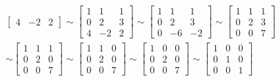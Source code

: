 \begin{gather*}
\begin{bmatrix}
        4 & -2 & 2 
        \end{bmatrix}
        \sim
        \begin{bmatrix}
        1 & 1 & 1 \\
        0 & 2 & 3 \\
        4 & -2 & 2 
        \end{bmatrix}
        \sim
        \begin{bmatrix}
        1 & 1 & 1 \\
        0 & 2 & 3 \\
        0 & -6 & -2 
        \end{bmatrix}
        \sim
        \begin{bmatrix}
        1 & 1 & 1 \\
        0 & 2 & 3 \\
        0 & 0 & 7 
        \end{bmatrix}
        \\
        \sim
        \begin{bmatrix}
        1 & 1 & 1 \\
        0 & 2 & 0 \\
        0 & 0 & 7 
        \end{bmatrix}
        \sim
        \begin{bmatrix}
        1 & 1 & 0 \\
        0 & 2 & 0 \\
        0 & 0 & 7 
        \end{bmatrix}
        \sim
        \begin{bmatrix}
        1 & 0 & 0 \\
        0 & 2 & 0 \\
        0 & 0 & 7 
        \end{bmatrix}
        \sim
        \begin{bmatrix}
        1 & 0 & 0 \\
        0 & 1 & 0 \\
        0 & 0 & 1 
        \end{bmatrix}       
\end{gather*}
\\

